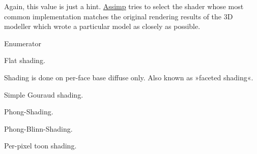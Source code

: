 Again, this value is just a hint. \hyperlink{class_assimp}{Assimp} tries to select the shader whose most common implementation matches the original rendering results of the 3\+D modeller which wrote a particular model as closely as possible. \begin{Desc}
\item[Enumerator]\par
\begin{description}
\item[{\em 
\hypertarget{namespaceassimp_1_1material_ad8134a703f92e7023813f2b34a0753c0acf8c953c1aa623cac3059e1878974745}{Flat}\label{namespaceassimp_1_1material_ad8134a703f92e7023813f2b34a0753c0acf8c953c1aa623cac3059e1878974745}
}]Flat shading.

Shading is done on per-\/face base diffuse only. Also known as »faceted shading«. \item[{\em 
\hypertarget{namespaceassimp_1_1material_ad8134a703f92e7023813f2b34a0753c0aecd03e3cff10447a2ba41b3a9a2feb80}{Gouraud}\label{namespaceassimp_1_1material_ad8134a703f92e7023813f2b34a0753c0aecd03e3cff10447a2ba41b3a9a2feb80}
}]Simple Gouraud shading. \item[{\em 
\hypertarget{namespaceassimp_1_1material_ad8134a703f92e7023813f2b34a0753c0adab047c759c806396402bc83eaefefca}{Phong}\label{namespaceassimp_1_1material_ad8134a703f92e7023813f2b34a0753c0adab047c759c806396402bc83eaefefca}
}]Phong-\/\+Shading. \item[{\em 
\hypertarget{namespaceassimp_1_1material_ad8134a703f92e7023813f2b34a0753c0a1db085775f8a1e79a92a9fcab496100a}{Blinn}\label{namespaceassimp_1_1material_ad8134a703f92e7023813f2b34a0753c0a1db085775f8a1e79a92a9fcab496100a}
}]Phong-\/\+Blinn-\/\+Shading. \item[{\em 
\hypertarget{namespaceassimp_1_1material_ad8134a703f92e7023813f2b34a0753c0a3f3936152e61ad1272858b220893c10c}{Toon}\label{namespaceassimp_1_1material_ad8134a703f92e7023813f2b34a0753c0a3f3936152e61ad1272858b220893c10c}
}]Per-\/pixel toon shading.


\end{description}
\end{Desc}
